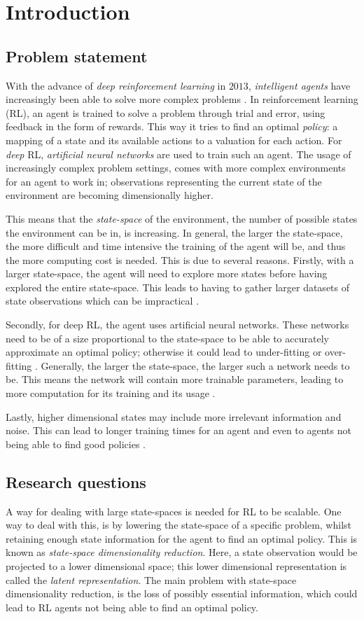 \chapter{Introduction}\label{introduction}
\section{Problem statement}
With the advance of \emph{deep reinforcement learning} in $2013$, \emph{intelligent agents} have increasingly been able to solve more complex problems \cite{deeprl}. In reinforcement learning (RL), an agent is trained to solve a problem through trial and error, using feedback in the form of rewards. This way it tries to find an optimal \emph{policy}: a mapping of a state and its available actions to a valuation for each action. For \emph{deep} RL, \emph{artificial neural networks} are used to train such an agent. The usage of increasingly complex problem settings, comes with more complex environments for an agent to work in; observations representing the current state of the environment are becoming dimensionally higher.

This means that the \emph{state-space} of the environment, the number of possible states the environment can be in, is increasing. In general, the larger the state-space, the more difficult and time intensive the training of the agent will be, and thus the more computing cost is needed. This is due to several reasons. Firstly, with a larger state-space, the agent will need to explore more states before having explored the entire state-space. This leads to having to gather larger datasets of state observations which can be impractical \cite{AE_2019}.

Secondly, for deep RL, the agent uses artificial neural networks. These networks need to be of a size proportional to the state-space to be able to accurately approximate an optimal policy; otherwise it could lead to under-fitting or over-fitting \cite{rlfitting}. Generally, the larger the state-space, the larger such a network needs to be. This means the network will contain more trainable parameters, leading to more computation for its training and its usage \cite{AE_2019}.

Lastly, higher dimensional states may include more irrelevant information and noise. This can lead to longer training times for an agent and even to agents not being able to find good policies \cite{AE_2016}.

\section{Research questions}
A way for dealing with large state-spaces is needed for RL to be scalable. One way to deal with this, is by lowering the state-space of a specific problem, whilst retaining enough state information for the agent to find an optimal policy. This is known as \emph{state-space dimensionality reduction}. Here, a state observation would be projected to a lower dimensional space; this lower dimensional representation is called the \emph{latent representation}. The main problem with state-space dimensionality reduction, is the loss of possibly essential information, which could lead to RL agents not being able to find an optimal policy. 

